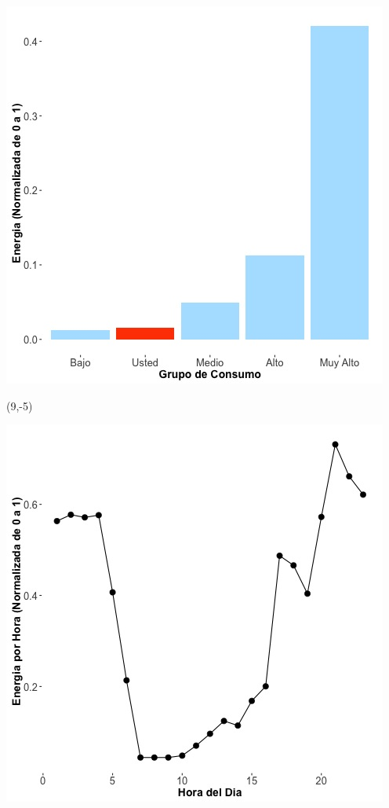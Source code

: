\documentclass{article}\usepackage[]{graphicx}\usepackage[]{color}
\newenvironment{knitrout}{}{} %
\begin{document}
\begin{knitrout}
\color{fgcolor}
\includegraphics[scale=0.65]{figure/A12_neighbor_plot} 
\end{knitrout}

 \begin{textblock}{1}(9,-5)
\begin{minipage}{20em}
\begingroup

\endgroup
\end{minipage}
\end{textblock}


\begin{knitrout}
\color{fgcolor}
\includegraphics[scale=0.65]{figure/A12_plot_norm_median} 
\end{knitrout}
\end{document}
